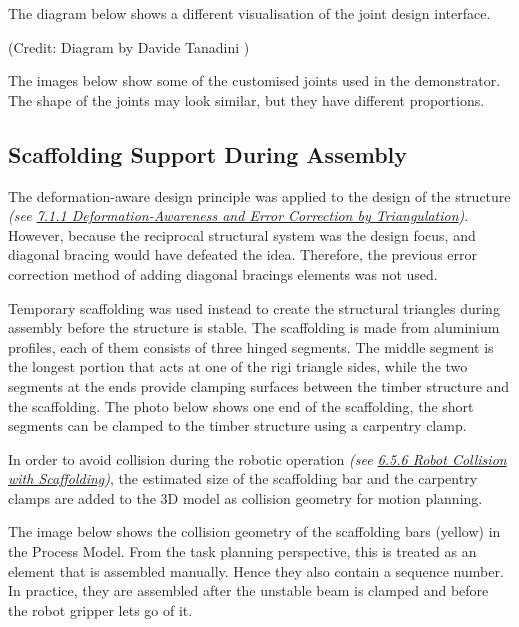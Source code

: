 


The diagram below shows a different visualisation of the joint design interface. 



{\footnotesize (Credit: Diagram by Davide Tanadini \parencite{tanadiniLimitAnalysisTimber2023})}

The images below show some of the customised joints used in the demonstrator. The shape of the joints may look similar, but they have different proportions. 




\subsection{Scaffolding Support During Assembly}

The deformation-aware design principle was applied to the design of the structure \textit{(see \ul{7.1.1 Deformation-Awareness and Error Correction by Triangulation})}. However, because the reciprocal structural system was the design focus, and diagonal bracing would have defeated the idea. Therefore, the previous error correction method of adding diagonal bracings elements was not used.

Temporary scaffolding was used instead to create the structural triangles during assembly before the structure is stable. The scaffolding is made from aluminium profiles, each of them consists of three hinged segments. The middle segment is the longest portion that acts at one of the rigi triangle sides, while the two segments at the ends provide clamping surfaces between the timber structure and the scaffolding. The photo below shows one end of the scaffolding, the short segments can be clamped to the timber structure using a carpentry clamp.




In order to avoid collision during the robotic operation \textit{(see \ul{6.5.6 Robot Collision with Scaffolding})}, the estimated size of the scaffolding bar and the carpentry clamps are added to the 3D model as collision geometry for motion planning.

The image below shows the collision geometry of the scaffolding bars (yellow) in the Process Model. From the task planning perspective, this is treated as an element that is assembled manually. Hence they also contain a sequence number. In practice, they are assembled after the unstable beam is clamped and before the robot gripper lets go of it.

